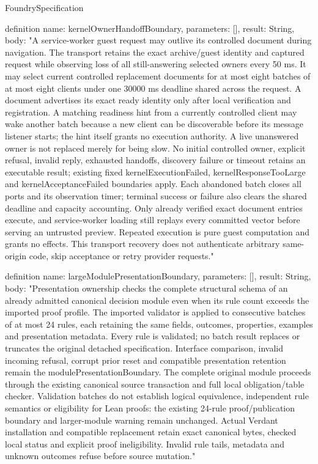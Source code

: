 \begin{lexlean}{FoundrySpecification}
\begin{semanticmodule}
definition{
  name: kernelOwnerHandoffBoundary,
  parameters: [],
  result: String,
  body: "A service-worker guest request may outlive its controlled document during navigation. The transport retains the exact archive/guest identity and captured request while observing loss of all still-answering selected owners every 50 ms. It may select current controlled replacement documents for at most eight batches of at most eight clients under one 30000 ms deadline shared across the request. A document advertises its exact ready identity only after local verification and registration. A matching readiness hint from a currently controlled client may wake another batch because a new client can be discoverable before its message listener starts; the hint itself grants no execution authority. A live unanswered owner is not replaced merely for being slow. No initial controlled owner, explicit refusal, invalid reply, exhausted handoffs, discovery failure or timeout retains an executable result; existing fixed kernelExecutionFailed, kernelResponseTooLarge and kernelAcceptanceFailed boundaries apply. Each abandoned batch closes all ports and its observation timer; terminal success or failure also clears the shared deadline and capacity accounting. Only already verified exact document entries execute, and service-worker loading still replays every committed vector before serving an untrusted preview. Repeated execution is pure guest computation and grants no effects. This transport recovery does not authenticate arbitrary same-origin code, skip acceptance or retry provider requests."
}

definition{
  name: largeModulePresentationBoundary,
  parameters: [],
  result: String,
  body: "Presentation ownership checks the complete structural schema of an already admitted canonical decision module even when its rule count exceeds the imported proof profile. The imported validator is applied to consecutive batches of at most 24 rules, each retaining the same fields, outcomes, properties, examples and presentation metadata. Every rule is validated; no batch result replaces or truncates the original detached specification. Interface comparison, invalid incoming refusal, corrupt prior reset and compatible presentation retention remain the modulePresentationBoundary. The complete original module proceeds through the existing canonical source transaction and full local obligation/table checker. Validation batches do not establish logical equivalence, independent rule semantics or eligibility for Lean proofs: the existing 24-rule proof/publication boundary and larger-module warning remain unchanged. Actual Verdant installation and compatible replacement retain exact canonical bytes, checked local status and explicit proof ineligibility. Invalid rule tails, metadata and unknown outcomes refuse before source mutation."
}


\end{semanticmodule}
\end{lexlean}
